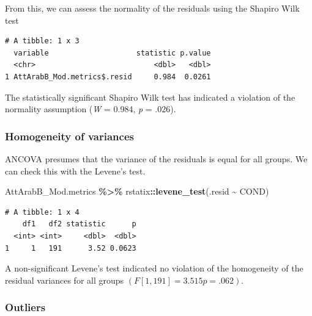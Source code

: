 \documentclass[
  11pt,
]{book}
\newenvironment{Shaded}{\begin{snugshade}}{\end{snugshade}}
\newcommand{\CommentTok}[1]{\textcolor[rgb]{0.37,0.37,0.37}{\textit{#1}}}
\newcommand{\FunctionTok}[1]{\textcolor[rgb]{0.27,0.27,0.27}{\textbf{#1}}}
\newcommand{\NormalTok}[1]{#1}
\newcommand{\SpecialCharTok}[1]{\textcolor[rgb]{0.43,0.43,0.43}{\textbf{#1}}}
\begin{document}
From this, we can assess the normality of the residuals using the Shapiro Wilk test

\begin{Shaded}
\end{Shaded}

\begin{verbatim}
# A tibble: 1 x 3
  variable                    statistic p.value
  <chr>                           <dbl>   <dbl>
1 AttArabB_Mod.metrics$.resid     0.984  0.0261
\end{verbatim}

The statistically significant Shapiro Wilk test has indicated a violation of the normality assumption (\emph{W} = 0.984, \emph{p} = .026).

\hypertarget{homogeneity-of-variances}{%
\subsubsection{Homogeneity of variances}\label{homogeneity-of-variances}}

ANCOVA presumes that the variance of the residuals is equal for all groups. We can check this with the Levene's test.

\begin{Shaded}
\begin{Highlighting}[]
\NormalTok{AttArabB\_Mod.metrics }\SpecialCharTok{\%\textgreater{}\%}
\NormalTok{    rstatix}\SpecialCharTok{::}\FunctionTok{levene\_test}\NormalTok{(.resid }\SpecialCharTok{\textasciitilde{}}\NormalTok{ COND)}
\end{Highlighting}
\end{Shaded}

\begin{verbatim}
# A tibble: 1 x 4
    df1   df2 statistic      p
  <int> <int>     <dbl>  <dbl>
1     1   191      3.52 0.0623
\end{verbatim}

A non-significant Levene's test indicated no violation of the homogeneity of the residual variances for all groups \((F[1, 191] = 3.515 p = .062)\).

\hypertarget{outliers}{%
\subsubsection{Outliers}\label{outliers}}
\end{document}
